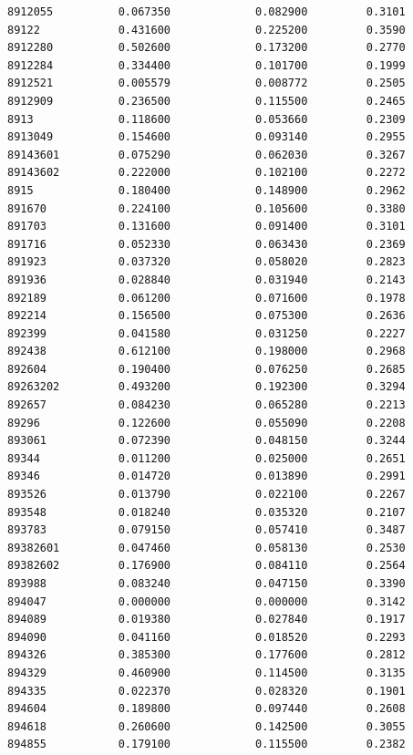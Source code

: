\documentclass[
  letterpaper,
  DIV=11,
  numbers=noendperiod]{scrartcl}
\begin{document}
\begin{verbatim}
8912055          0.067350             0.082900         0.3101
89122            0.431600             0.225200         0.3590
8912280          0.502600             0.173200         0.2770
8912284          0.334400             0.101700         0.1999
8912521          0.005579             0.008772         0.2505
8912909          0.236500             0.115500         0.2465
8913             0.118600             0.053660         0.2309
8913049          0.154600             0.093140         0.2955
89143601         0.075290             0.062030         0.3267
89143602         0.222000             0.102100         0.2272
8915             0.180400             0.148900         0.2962
891670           0.224100             0.105600         0.3380
891703           0.131600             0.091400         0.3101
891716           0.052330             0.063430         0.2369
891923           0.037320             0.058020         0.2823
891936           0.028840             0.031940         0.2143
892189           0.061200             0.071600         0.1978
892214           0.156500             0.075300         0.2636
892399           0.041580             0.031250         0.2227
892438           0.612100             0.198000         0.2968
892604           0.190400             0.076250         0.2685
89263202         0.493200             0.192300         0.3294
892657           0.084230             0.065280         0.2213
89296            0.122600             0.055090         0.2208
893061           0.072390             0.048150         0.3244
89344            0.011200             0.025000         0.2651
89346            0.014720             0.013890         0.2991
893526           0.013790             0.022100         0.2267
893548           0.018240             0.035320         0.2107
893783           0.079150             0.057410         0.3487
89382601         0.047460             0.058130         0.2530
89382602         0.176900             0.084110         0.2564
893988           0.083240             0.047150         0.3390
894047           0.000000             0.000000         0.3142
894089           0.019380             0.027840         0.1917
894090           0.041160             0.018520         0.2293
894326           0.385300             0.177600         0.2812
894329           0.460900             0.114500         0.3135
894335           0.022370             0.028320         0.1901
894604           0.189800             0.097440         0.2608
894618           0.260600             0.142500         0.3055
894855           0.179100             0.115500         0.2382

\end{verbatim}
\end{document}
